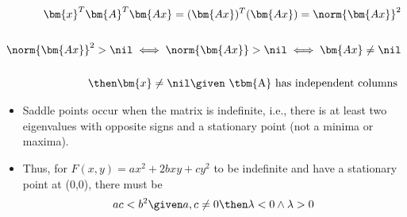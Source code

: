 \begin{itemize}
\begin{enumerate}
    \begin{align*}
      \bm{x}^T \bm{A}^T \bm{Ax} =  (\bm{Ax})^T(\bm{Ax}) = \norm{\bm{Ax}}^2 \\\\
      \norm{\bm{Ax}}^2 > \nil \iff \norm{\bm{Ax}} > \nil \iff \bm{Ax} \neq \nil \\\\
      \then \bm{x} \neq \nil \given ~\text{\tbm{A} has independent columns}~
    \end{align*}

    \begin{itemize}\color{foreground}
      \item Saddle points occur when the matrix is indefinite, i.e., there is
        at least two eigenvalues with opposite signs and a stationary point
        (not a minima or maxima).
      \item Thus, for \(F(x,y) = ax^2 + 2bxy + cy^2 \) to be indefinite and have a stationary point at (0,0), there
        must be \[ac < b^2 \given a,c \neq 0 \then \lambda < 0 \land \lambda > 0\]
    \end{itemize}
  \end{enumerate}


\end{itemize}

